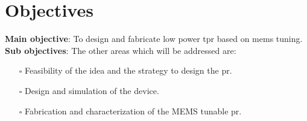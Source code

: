 \documentclass[../report.tex]{subfiles}
\begin{document}
	\section{Objectives}
\textbf{Main objective}: To design and fabricate low power \gls{tpr} based on \gls{mems} tuning. \\

\noindent \textbf{Sub objectives}: The other areas which will be addressed are:
\begin{itemize}
	\item[$\square$] Feasibility of the idea and the strategy to design the \gls{pr}. 
	\item[$\square$] Design and simulation of the device.
	\item[$\square$] Fabrication and characterization of the MEMS tunable \gls{pr}.
\end{itemize}

	
	
\end{document}
